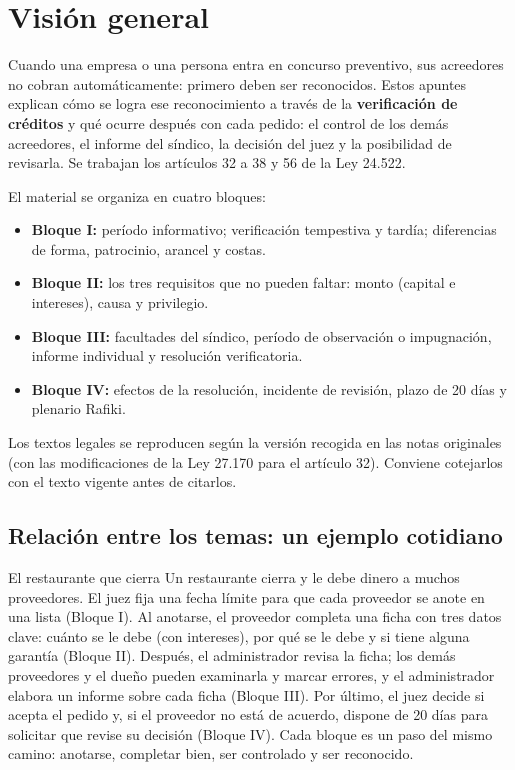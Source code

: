 \documentclass[12pt,oneside]{book}
\begin{document}
\chapter*{Visión general}

Cuando una empresa o una persona entra en concurso preventivo, sus acreedores no cobran automáticamente: primero deben ser reconocidos. Estos apuntes explican cómo se logra ese reconocimiento a través de la \textbf{verificación de créditos} y qué ocurre después con cada pedido: el control de los demás acreedores, el informe del síndico, la decisión del juez y la posibilidad de revisarla. Se trabajan los artículos 32 a 38 y 56 de la Ley 24.522.

El material se organiza en cuatro bloques:

\begin{itemize}
    \item \textbf{Bloque I:} período informativo; verificación tempestiva y tardía; diferencias de forma, patrocinio, arancel y costas.
    \item \textbf{Bloque II:} los tres requisitos que no pueden faltar: monto (capital e intereses), causa y privilegio.
    \item \textbf{Bloque III:} facultades del síndico, período de observación o impugnación, informe individual y resolución verificatoria.
    \item \textbf{Bloque IV:} efectos de la resolución, incidente de revisión, plazo de 20 días y plenario Rafiki.
\end{itemize}

\begin{note}
Los textos legales se reproducen según la versión recogida en las notas originales (con las modificaciones de la Ley 27.170 para el artículo 32). Conviene cotejarlos con el texto vigente antes de citarlos.
\end{note}

\section*{Relación entre los temas: un ejemplo cotidiano}

\begin{example}{El restaurante que cierra}
Un restaurante cierra y le debe dinero a muchos proveedores. El juez fija una fecha límite para que cada proveedor se anote en una lista (Bloque I). Al anotarse, el proveedor completa una ficha con tres datos clave: cuánto se le debe (con intereses), por qué se le debe y si tiene alguna garantía (Bloque II). Después, el administrador revisa la ficha; los demás proveedores y el dueño pueden examinarla y marcar errores, y el administrador elabora un informe sobre cada ficha (Bloque III). Por último, el juez decide si acepta el pedido y, si el proveedor no está de acuerdo, dispone de 20 días para solicitar que revise su decisión (Bloque IV). Cada bloque es un paso del mismo camino: anotarse, completar bien, ser controlado y ser reconocido.
\end{example}
\end{document}

